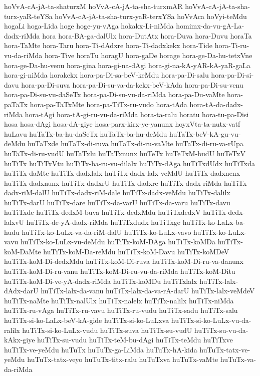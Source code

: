 {hoVvA-cA-jA-ta-shaturxM
hoVvA-cA-jA-ta-sha-turxmAR
hoVvA-cA-jA-ta-sha-turx-yaR-teYSa
hoVvA-cA-jA-ta-sha-turx-yaR-terxYSa
hoVvAca
hoVyi-teMdu
hogaLi
hoga-Lida
hoge
hoge-yu-vAga
hokakx-Li-niMda
homimx-da-vu-gA-La-dadx-riMda
hora
hora-BA-ga-dalUlx
hora-DutAtx
hora-Duva
hora-Duvu
horaTa
hora-TaMte
hora-Taru
hora-Ti-dAdxre
hora-Ti-dadxkekx
hora-Tide
hora-Ti-ru-vu-da-riMda
hora-Tive
horaTu
horagU
hora-gaDe
horage
hora-ge-Da-hu-tetxVne
hora-ge-Da-hu-venu
hora-gina
hora-gi-na-dAgi
hora-gi-na-kA-yAR-kA-yaR-gaLa
hora-gi-niMda
horakekx
hora-pa-Di-sa-beV-keMdu
hora-pa-Di-salu
hora-pa-Di-si-davu
hora-pa-Di-suva
hora-pa-Di-su-va-da-kekx-beV-kAda
hora-pa-Di-su-venu
hora-pa-Di-su-vu-daSeTx
hora-pa-Di-su-vu-da-riMda
hora-pa-Du-vaMte
hora-paTaTx
hora-pa-TaTxMte
hora-pa-TiTx-ru-vudo
hora-tAda
hora-tA-da-dadx-riMda
hora-tAgi
hora-tA-gi-ru-vu-da-riMda
hora-ta-ralu
horatu
hora-tu-pa-Disi
hosa
hosa-dAgi
hosa-dA-giye
hosa-parx-kirx-ye-yanunx
hoyxVta-ta-nutx-vatf
huLavu
huTaTx-ba-hu-daSeTx
huTaTx-ba-hu-deMdu
huTaTx-beV-kA-gu-vu-deMdu
huTaTxde
huTaTx-di-ruva
huTaTx-di-ru-vaMte
huTaTx-di-ru-va-rUpa
huTaTx-di-ru-vudU
huTaTxlu
huTaTxnunx
huTeTx
huTeTxM-budU
huTeTxV
huTiTx
huTiTxVtu
huTiTx-ba-ru-vu-dilalx
huTiTx-dAga
huTiTxdUdx
huTiTxda
huTiTx-daMte
huTiTx-dadxlalx
huTiTx-dadx-lalx-veMdU
huTiTx-dadxnenx
huTiTx-dadxnunx
huTiTx-dadxrU
huTiTx-dadxre
huTiTx-dadx-riMda
huTiTx-dadx-riM-dalU
huTiTx-dadx-riM-dale
huTiTx-dadx-veMdu
huTiTx-dalilx
huTiTx-darU
huTiTx-dare
huTiTx-da-varU
huTiTx-da-varu
huTiTx-davu
huTiTxde
huTiTx-dedxM-buva
huTiTx-dedxMdu
huTiTxdedxV
huTiTx-dedx-lalxvU
huTiTx-de-yA-dadx-riMda
huTiTxdudx
huTiTxge
huTiTx-ko-LaLx-ba-hudu
huTiTx-ko-LuLx-va-da-riM-dalU
huTiTx-ko-LuLx-vavo
huTiTx-ko-LuLx-vavu
huTiTx-ko-LuLx-vu-deMdu
huTiTx-koM-DAga
huTiTx-koMDa
huTiTx-koM-DaMte
huTiTx-koM-Da-reMdu
huTiTx-koM-Davu
huTiTx-koMDeV
huTiTx-koM-Di-dedxMdu
huTiTx-koM-Di-ruva
huTiTx-koM-Di-ru-va-danunx
huTiTx-koM-Di-ru-vanu
huTiTx-koM-Di-ru-vu-da-riMda
huTiTx-koM-Ditu
huTiTx-koM-Di-ve-yA-dadx-riMda
huTiTx-koMDu
huTiTxlalx
huTiTx-lalx-dAdx-darU
huTiTx-lalx-da-vanu
huTiTx-lalx-da-va-rA-darU
huTiTx-lalx-veMdeV
huTiTx-naMte
huTiTx-nalUlx
huTiTx-nalelx
huTiTx-nalilx
huTiTx-niMda
huTiTx-ru-vAga
huTiTx-ru-vavu
huTiTx-ru-vudu
huTiTx-sadu
huTiTx-salu
huTiTx-si-ko-LaLx-beV-kA-gide
huTiTx-si-ko-LuLxva
huTiTx-si-ko-LuLx-vu-da-ralilx
huTiTx-si-ko-LuLx-vudu
huTiTx-suva
huTiTx-su-vudU
huTiTx-su-vu-da-kAkx-giye
huTiTx-su-vudu
huTiTx-teM-bu-dAgi
huTiTx-teMdu
huTiTxve
huTiTx-ve-yeMdu
huTuTx
huTuTx-ga-LiMda
huTuTx-hA-kida
huTuTx-tatx-ve-yeMdu
huTuTx-tatx-veyo
huTuTx-titx-ralu
huTuTxva
huTuTx-vaMte
huTuTx-va-da-riMda
}
